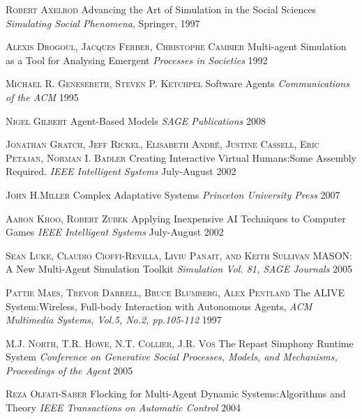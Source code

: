 \documentclass[runningheads]{llncs}
\begin{document}
\begin{thebibliography}{0}

\textsc{Robert Axelrod}
\newblock Advancing the Art of Simulation in the Social Sciences
\newblock \emph{Simulating Social Phenomena}, Springer, 1997

\textsc{Alexis Drogoul, Jacques Ferber, Christophe Cambier}
\newblock Multi-agent Simulation as a Tool for Analysing Emergent 
\newblock \emph{Processes in Societies} 1992

\textsc{Michael R. Genesereth, Steven P. Ketchpel}
\newblock Software Agents
\newblock \emph{Communications of the ACM} 1995

\textsc{Nigel Gilbert}
\newblock Agent-Based Models
\newblock \emph{SAGE Publications} 2008

\textsc{Jonathan Gratch, Jeff Rickel, Elisabeth André, Justine Cassell, Eric Petajan, Norman I. Badler}
\newblock Creating Interactive Virtual Humans:Some Assembly Required.
\newblock \emph{IEEE Intelligent Systems} July-August 2002

\textsc{John H.Miller}
\newblock Complex Adaptative Systems 
\newblock \emph{Princeton University Press} 2007

\textsc{Aaron Khoo, Robert Zubek}
\newblock Applying Inexpensive AI Techniques to Computer Games
\newblock \emph{IEEE Intelligent Systems} July-August 2002

\textsc{Sean Luke, Claudio Cioffi-Revilla, Liviu Panait, and Keith Sullivan}
\newblock MASON: A New Multi-Agent Simulation Toolkit
\newblock \emph{Simulation Vol. 81, SAGE Journals} 2005

\textsc{Pattie Maes, Trevor Darrell, Bruce Blumberg, Alex Pentland}
\newblock The ALIVE System:Wireless, Full-body Interaction with Autonomous Agents, 
\newblock \emph{ACM Multimedia Systems, Vol.5, No.2, pp.105-112} 1997

\textsc{M.J. North, T.R. Howe, N.T. Collier, J.R. Vos}
\newblock The Repast Simphony Runtime System 
\newblock \emph{Conference on Generative Social Processes, Models, and Mechanisms, Proceedings of the Agent} 2005

\textsc{Reza Olfati-Saber}
\newblock Flocking for Multi-Agent Dynamic Systems:Algorithms and Theory 
\newblock \emph{IEEE Transactions on Automatic Control} 2004


\end{thebibliography}
\end{document}
